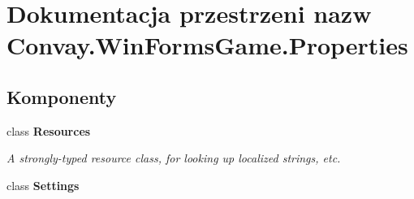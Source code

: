 \hypertarget{namespace_convay_1_1_win_forms_game_1_1_properties}{}\section{Dokumentacja przestrzeni nazw Convay.\+Win\+Forms\+Game.\+Properties}
\label{namespace_convay_1_1_win_forms_game_1_1_properties}
\subsection*{Komponenty}
\begin{DoxyCompactItemize}
\item 
class {\bfseries Resources}
\begin{DoxyCompactList}\small\item\em A strongly-\/typed resource class, for looking up localized strings, etc. \end{DoxyCompactList}\item 
class {\bfseries Settings}
\end{DoxyCompactItemize}
